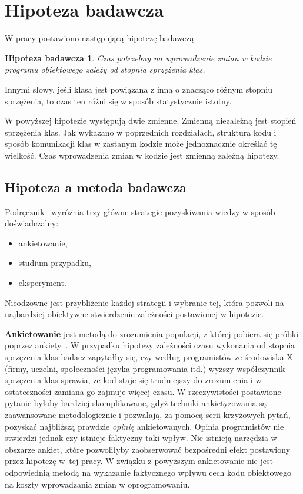 \section{Hipoteza badawcza}

W pracy postawiono następującą hipotezę badawczą:

\newtheorem{hypothesis}{Hipoteza badawcza}

\begin{hypothesis}
    Czas potrzebny na wprowadzenie zmian w kodzie programu obiektowego zależy od stopnia sprzężenia klas.
\end{hypothesis}

Innymi słowy, jeśli klasa jest powiązana z inną o znacząco różnym stopniu sprzężenia, to czas ten różni się w sposób
statystycznie istotny.

W powyższej hipotezie występują dwie zmienne.
Zmienną niezależną jest stopień sprzężenia klas.
Jak wykazano w poprzednich rozdziałach, struktura kodu i sposób komunikacji klas w zastanym kodzie może
jednoznacznie określać tę wielkość.
Czas wprowadzenia zmian w kodzie jest zmienną zależną hipotezy.

\subsection{Hipoteza a metoda badawcza}

Podręcznik~\cite{wohlin2012experimentation} wyróżnia trzy główne strategie pozyskiwania wiedzy w sposób doświadczalny:
\begin{itemize}
    \item ankietowanie,
    \item studium przypadku,
    \item eksperyment.
\end{itemize}
Nieodzowne jest przybliżenie każdej strategii i wybranie tej, która pozwoli na najbardziej obiektywne stwierdzenie
zależności postawionej w hipotezie.

\textbf{Ankietowanie} jest metodą do zrozumienia populacji, z której pobiera się próbki poprzez ankiety~\cite{babbie1990survey}.
W przypadku hipotezy zależności czasu wykonania od stopnia sprzężenia klas badacz zapytałby się, czy według
programistów ze środowiska X (firmy, uczelni, społeczności języka programowania itd.) wyższy współczynnik sprzężenia
klas sprawia, że kod staje się trudniejszy do zrozumienia i w ostateczności zamiana go zajmuje więcej czasu.
W rzeczywistości postawione pytanie byłoby bardziej skomplikowane, gdyż techniki ankietyzowania są zaawansowane
metodologicznie i pozwalają, za pomocą serii krzyżowych pytań, pozyskać najbliższą prawdzie \emph{opinię} ankietowanych.
Opinia programistów nie stwierdzi jednak czy istnieje faktyczny taki wpływ.
Nie istnieją narzędzia w obszarze ankiet, które pozwoliłyby zaobserwować bezpośredni efekt postawiony przez hipotezę
w~tej pracy.
W związku z powyższym ankietowanie nie jest odpowiednią metodą na wykazanie faktycznego wpływu cech kodu
obiektowego na koszty wprowadzania zmian w oprogramowaniu.

